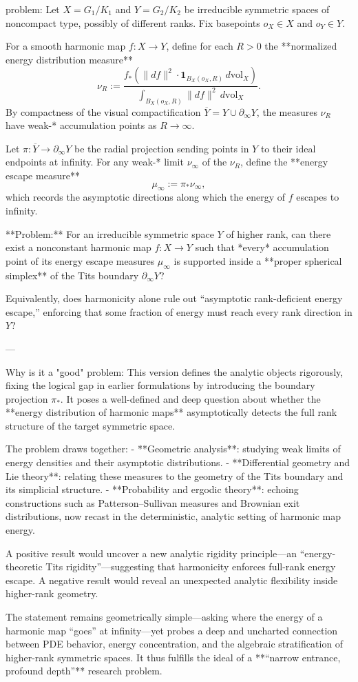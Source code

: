 problem:  
Let \( X = G_1/K_1 \) and \( Y = G_2/K_2 \) be irreducible symmetric spaces of noncompact type, possibly of different ranks.  Fix basepoints \(o_X \in X\) and \(o_Y \in Y\).  

For a smooth harmonic map \( f : X \to Y \), define for each \(R > 0\) the **normalized energy distribution measure**
\[
\nu_R := \frac{f_*\!\left( \|df\|^2 \cdot \mathbf{1}_{B_X(o_X,R)} \, d\mathrm{vol}_X \right)}{\int_{B_X(o_X,R)} \|df\|^2 \, d\mathrm{vol}_X}.
\]
By compactness of the visual compactification \(\overline{Y}=Y\cup\partial_\infty Y\), the measures \(\nu_R\) have weak-* accumulation points as \(R\to\infty\).  

Let \(\pi : \overline{Y} \to \partial_\infty Y\) be the radial projection sending points in \(Y\) to their ideal endpoints at infinity.  For any weak-* limit \(\nu_\infty\) of the \(\nu_R\), define the **energy escape measure**
\[
\mu_\infty := \pi_* \nu_\infty,
\]
which records the asymptotic directions along which the energy of \(f\) escapes to infinity.

**Problem:**  
For an irreducible symmetric space \(Y\) of higher rank, can there exist a nonconstant harmonic map \( f: X \to Y \) such that *every* accumulation point of its energy escape measures \( \mu_\infty \) is supported inside a **proper spherical simplex** of the Tits boundary \( \partial_\infty Y \)?  

Equivalently, does harmonicity alone rule out “asymptotic rank-deficient energy escape,” enforcing that some fraction of energy must reach every rank direction in \(Y\)?  

---

Why is it a "good" problem:  
This version defines the analytic objects rigorously, fixing the logical gap in earlier formulations by introducing the boundary projection \(\pi_*\). It poses a well-defined and deep question about whether the **energy distribution of harmonic maps** asymptotically detects the full rank structure of the target symmetric space.

The problem draws together:
- **Geometric analysis**: studying weak limits of energy densities and their asymptotic distributions.
- **Differential geometry and Lie theory**: relating these measures to the geometry of the Tits boundary and its simplicial structure.
- **Probability and ergodic theory**: echoing constructions such as Patterson–Sullivan measures and Brownian exit distributions, now recast in the deterministic, analytic setting of harmonic map energy.

A positive result would uncover a new analytic rigidity principle—an “energy-theoretic Tits rigidity”—suggesting that harmonicity enforces full-rank energy escape. A negative result would reveal an unexpected analytic flexibility inside higher-rank geometry.

The statement remains geometrically simple—asking where the energy of a harmonic map “goes” at infinity—yet probes a deep and uncharted connection between PDE behavior, energy concentration, and the algebraic stratification of higher-rank symmetric spaces. It thus fulfills the ideal of a **“narrow entrance, profound depth”** research problem.